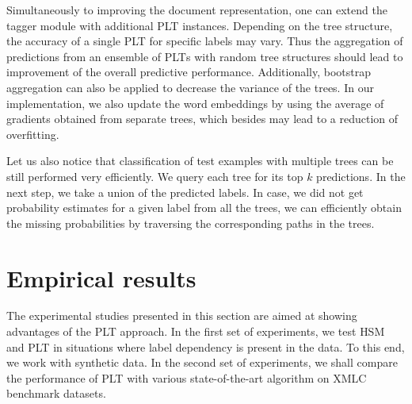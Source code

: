 \documentclass{article}
\newcommand{\Algo}[1]{\textsc{#1}}
\newcommand{\sectionBefore}{-0pt}
\newcommand{\sectionAfter}{-0pt}
\begin{document}
{Simultaneously to improving the document representation, one can extend the tagger module with additional \Algo{PLT} instances.
Depending on the tree structure, the accuracy of a single \Algo{PLT} for specific labels may vary.
Thus the aggregation of predictions from an ensemble of \Algo{PLT}s with random tree structures should lead to improvement of the overall predictive performance.
Additionally, bootstrap aggregation can also be applied to decrease the variance of the trees. 
%
In our implementation, we also update the word embeddings by using %
the average of gradients obtained from separate trees, which besides may lead to a reduction of overfitting.

Let us also notice that classification of test examples with multiple trees can be still performed very efficiently. We query each tree for its top $k$ predictions. In the next step, we take a union of the predicted labels. In case, we did not get probability estimates for a given label from all the trees, we can efficiently obtain the missing probabilities by traversing the corresponding paths in the trees.



\vspace{\sectionBefore}
\section{Empirical results}
\label{sec:empirical_results}
\vspace{\sectionAfter}

The experimental studies presented in this section are aimed at showing advantages of the PLT approach. In the first set of experiments, we test \Algo{HSM} and \Algo{PLT} in situations where label dependency is present in the data. To this end, we work with synthetic data. In the second set of experiments, we shall compare the performance of PLT with various state-of-the-art algorithm on XMLC benchmark datasets.

}
\end{document}
